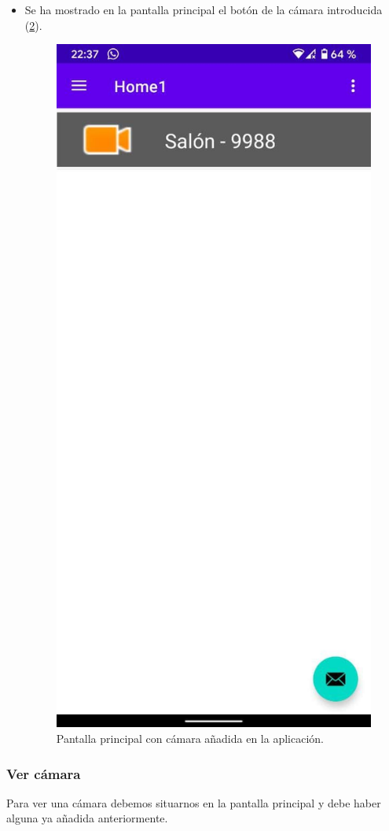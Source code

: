 \begin{itemize}
\begin{figure}[h!]
	\label{fig:appmanual7}
\end{figure}
\item
	Se ha mostrado en la pantalla principal el botón de la cámara introducida (\ref{fig:appmanual8}).
\begin{figure}[h!]
	\centering
	\includegraphics[width=0.35\linewidth]{img/manualuse5}
	\caption{Pantalla principal con cámara añadida en la aplicación.}
	\label{fig:appmanual8}
\end{figure}
\end{itemize}

\subsubsection{Ver cámara}

Para ver una cámara debemos situarnos en la pantalla principal y debe haber alguna ya añadida anteriormente.

